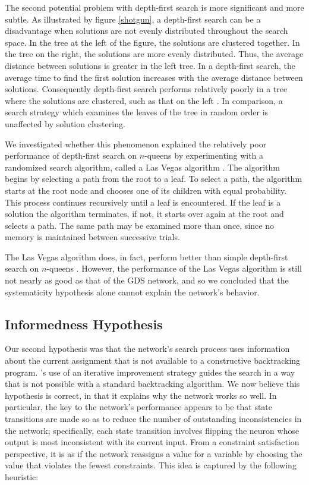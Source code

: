 The second potential problem with depth-first search is more significant
and more subtle. As illustrated by figure \ref{shotgun}, a depth-first
search can be a
disadvantage when solutions are not evenly distributed throughout the
search space.  In the tree at the left of the figure, the solutions 
are clustered together. In the tree on the right,
the solutions are more evenly distributed. Thus, the average distance
between solutions is greater in the left tree.  In a depth-first
search, the average time to find the first solution 
increases with the average distance between solutions. Consequently
depth-first search performs relatively poorly in a tree where
the solutions are clustered, such as that on the left \cite{ginsberg,langley}.
In comparison,
a search strategy which examines the leaves of the tree in random
order is unaffected by solution clustering.

We investigated whether this phenomenon explained the relatively poor
performance 
of depth-first search on $n$-queens by experimenting with a randomized
search algorithm, called a Las Vegas algorithm \cite{brassard}.  The
algorithm begins by selecting a path from the root to a leaf. To
select a path, the algorithm starts at the root node and chooses one
of its children with equal probability. This process continues
recursively until a leaf is encountered.  If the leaf is a solution
the algorithm terminates, if not, it starts over again at the root and
selects a path. The same path may be examined more than once, since
no memory is maintained between successive trials.

The Las Vegas algorithm does, in fact, perform better than simple
depth-first search on $n$-queens \cite{brassard}.
However, the performance of the Las
Vegas algorithm is still not nearly as good as that of the GDS
network, and so we concluded that the systematicity hypothesis alone
cannot explain the network's behavior.

\subsection{Informedness Hypothesis}

Our second hypothesis was that the network's search process uses
information about the current assignment
that is not available to a constructive backtracking program.
's use of an iterative
improvement strategy guides the search in a way that is not possible
with a standard backtracking algorithm. 
We now believe this hypothesis
is correct, in that it explains why the network works so well.  In
particular, the key to the network's performance appears to be that
state transitions are made so as to reduce the number of outstanding
inconsistencies in the network; specifically, each state transition involves
flipping the neuron whose output is most
inconsistent with its current input. From a constraint satisfaction
perspective, it is as if the network reassigns a value for a variable
by choosing the value that violates the fewest constraints.
This idea is captured by the following heuristic:

